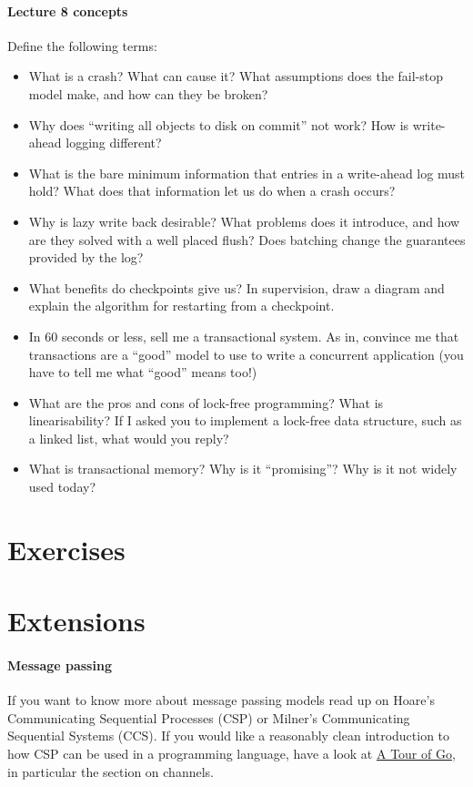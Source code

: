 \documentclass[12pt,a4paper,oneside,openright]{report}
\newcommand{\question}[2]{\paragraph{#1} #2}
\begin{document}
\question{Lecture 8 concepts}{Define the following terms:
  \begin{itemize}
  \item What is a crash? What can cause it? What assumptions does the
    fail-stop model make, and how can they be broken?
  \item Why does ``writing all objects to disk on commit'' not work?
    How is write-ahead logging different?
  \item What is the bare minimum information that entries in a
    write-ahead log must hold? What does that information let us do
    when a crash occurs?
  \item Why is lazy write back desirable? What problems does it
    introduce, and how are they solved with a well placed flush? Does
    batching change the guarantees provided by the log?
  \item What benefits do checkpoints give us? In supervision, draw a
    diagram and explain the algorithm for restarting from a
    checkpoint.
  \item In 60 seconds or less, sell me a transactional system. As in,
    convince me that transactions are a ``good'' model to use to write
    a concurrent application (you have to tell me what ``good'' means
    too!)
  \item What are the pros and cons of lock-free programming? What is
    linearisability? If I asked you to implement a lock-free data
    structure, such as a linked list, what would you reply?
  \item What is transactional memory? Why is it ``promising''? Why is
    it not widely used today?
  \end{itemize}
}


\section{Exercises}

\section{Extensions}

\question{Message passing}{If you want to know more about message
  passing models read up on Hoare's Communicating Sequential Processes
  (CSP) or Milner's Communicating Sequential Systems (CCS). If you
  would like a reasonably clean introduction to how CSP can be used in
  a programming language, have a look at
  \href{https://tour.golang.org}{A Tour of Go}, in particular the
  section on channels.}
\end{document}
